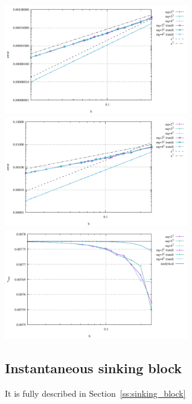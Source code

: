 \begin{center}
\includegraphics[width=8cm]{python_codes/fieldstone_76/results/bench3/errors_v}
\includegraphics[width=8cm]{python_codes/fieldstone_76/results/bench3/errors_p}\\
\includegraphics[width=8cm]{python_codes/fieldstone_76/results/bench3/vrms}
\end{center}

\subsection*{Instantaneous sinking block}

It is fully described in Section~\ref{ss:sinking_block}

